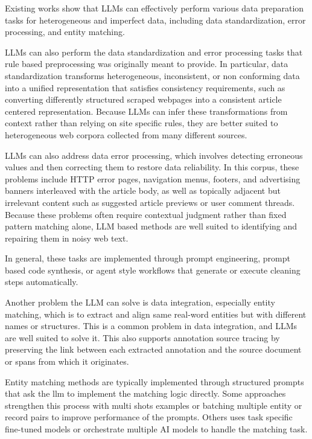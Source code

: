 \documentclass{article}
\begin{document}
Existing works show that LLMs can effectively perform various data preparation tasks for heterogeneous and imperfect data, including data standardization, error processing, and entity matching.

LLMs can also perform the data standardization and error processing tasks that rule based preprocessing was originally meant to provide. In particular, data standardization transforms heterogeneous, inconsistent, or non conforming data into a unified representation that satisfies consistency requirements, such as converting differently structured scraped webpages into a consistent article centered representation. Because LLMs can infer these transformations from context rather than relying on site specific rules, they are better suited to heterogeneous web corpora collected from many different sources.

LLMs can also address data error processing, which involves detecting erroneous values and then correcting them to restore data reliability. In this corpus, these problems include HTTP error pages, navigation menus, footers, and advertising banners interleaved with the article body, as well as topically adjacent but irrelevant content such as suggested article previews or user comment threads. Because these problems often require contextual judgment rather than fixed pattern matching alone, LLM based methods are well suited to identifying and repairing them in noisy web text.

In general, these tasks are implemented through prompt engineering, prompt based code synthesis, or agent style workflows that generate or execute cleaning steps automatically. 

Another problem the LLM can solve is data integration, especially entity matching, which is to extract and align same real-word entities but with different names or structures. This is a common problem in data integration, and LLMs are well suited to solve it. This also supports annotation source tracing by preserving the link between each extracted annotation and the source document or spans from which it originates.

Entity matching methods are typically implemented through structured prompts that ask the llm to implement the matching logic directly. Some approaches strengthen this process with multi shots examples or batching multiple entity or record pairs to improve performance of the prompts. Others uses task specific fine-tuned models or orchestrate multiple AI models to handle the matching task.
\end{document}
